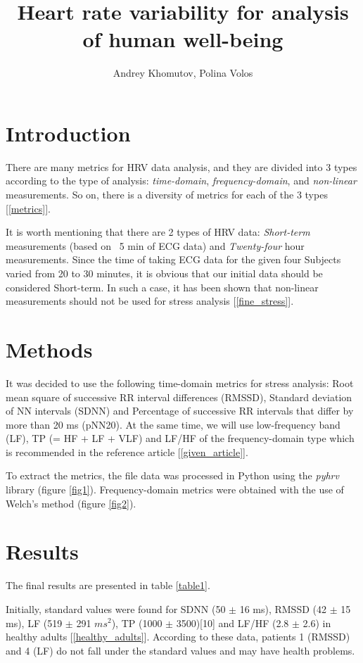 \documentclass[9pt,twocolumn,twoside,lineno]{gsajnl}
\title{Heart rate variability for analysis of human well-being}
\author[]{Andrey Khomutov, Polina Volos}
\begin{document}
\maketitle
\thispagestyle{firststyle}
\vspace{-13pt}%

\section{Introduction}
There are many metrics for HRV data analysis, and they are divided into 3 types according to the type of analysis:
\textit{time-domain}, \textit{frequency-domain}, and \textit{non-linear} measurements. So on, there is a diversity of metrics for each of the 3 types [\ref{metrics}]. 

It is worth mentioning that there are 2 types of HRV data: \textit{Short-term} measurements (based on ~5 min of ECG data) and \textit{Twenty-four} hour measurements. Since the time of taking ECG data for the given four Subjects varied from 20 to 30 minutes, it is obvious that our initial data should be considered Short-term. In such a case, it has been shown that non-linear measurements should not be used for stress analysis [\ref{fine_stress}]. 


\section{Methods}
It was decided to use the following time-domain metrics for stress analysis: Root mean square of successive RR interval
differences (RMSSD), Standard deviation of NN intervals (SDNN) and Percentage of successive RR intervals that differ by
more than 20 ms (pNN20). At the same time, we will use low-frequency band (LF), TP (= HF + LF + VLF) and LF/HF of the frequency-domain type which is recommended in the reference article [\ref{given_article}].

To extract the metrics, the file data was processed in Python using the \textit{pyhrv} library (figure \ref{fig1}). Frequency-domain metrics were obtained with the use of Welch's method (figure \ref{fig2}). 


\section{Results}
The final results are presented in table \ref{table1}. 

Initially, standard values were found for SDNN (50 $\pm$ 16 ms), RMSSD (42 $\pm$ 15 ms), LF (519 $\pm$ 291 $ms^2$), TP (1000 $\pm$ 3500)[10] and LF/HF (2.8 $\pm$ 2.6) in healthy adults [\ref{healthy_adults}]. According to these data, patients 1 (RMSSD) and 4 (LF) do not fall under the standard values and may have health problems. 
\end{document}
